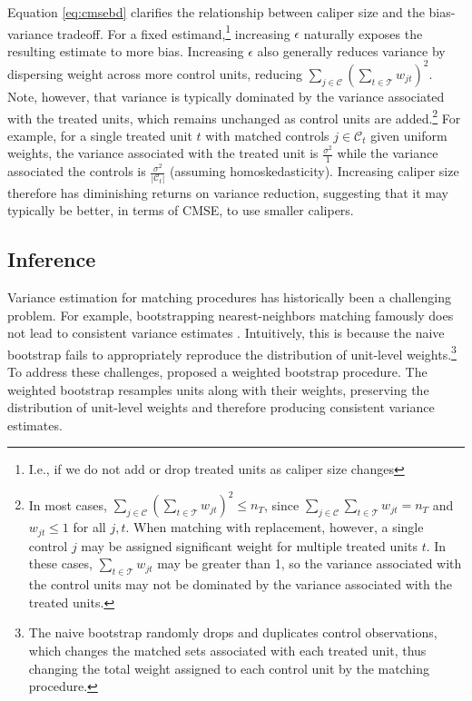 \documentclass{article}
\newcommand{\Ct}{\mathcal{C}_{t}}
\begin{document}
Equation \ref{eq:cmsebd} clarifies the relationship between caliper size and the bias-variance tradeoff.
For a fixed estimand,\footnote{I.e., if we do not add or drop treated units as caliper size changes} increasing $\epsilon$ naturally exposes the resulting estimate to more bias.
Increasing $\epsilon$ also generally reduces variance by dispersing weight across more control units, reducing $\sum_{j \in \mathcal{C}} (\sum_{t \in \mathcal{T}} w_{jt})^2$.
Note, however, that variance is typically dominated by the variance associated with the treated units, which remains unchanged as control units are added.\footnote{In most cases, $\sum_{j \in \mathcal{C}} (\sum_{t \in \mathcal{T}} w_{jt})^2 \leq n_T$, since $\sum_{j \in \mathcal{C}} \sum_{t \in \mathcal{T}} w_{jt} = n_T$ and $w_{jt} \leq 1$ for all $j, t$.
When matching with replacement, however, a single control $j$ may be assigned significant weight for multiple treated units $t$.
In these cases, $\sum_{t \in \mathcal{T}} w_{jt}$ may be greater than 1, so the variance associated with the control units may not be dominated by the variance associated with the treated units.}
For example, for a single treated unit $t$ with matched controls $j \in \Ct$ given uniform weights, the variance associated with the treated unit is
$\frac{\sigma^2}{1}$ while the variance associated the controls is $\frac{\sigma^2}{|\Ct|}$ (assuming homoskedasticity).
Increasing caliper size therefore has diminishing returns on variance reduction, suggesting that it may typically be better, in terms of CMSE, to use smaller calipers.


\subsection{Inference}


Variance estimation for matching procedures has historically been a challenging problem.
For example, bootstrapping nearest-neighbors matching famously does not lead to consistent variance estimates \citep{abadie2008failure}.
Intuitively, this is because the naive bootstrap fails to appropriately reproduce the distribution of unit-level weights.\footnote{The naive bootstrap randomly drops and duplicates control observations, which changes the matched sets associated with each treated unit, thus changing the total weight assigned to each control unit by the matching procedure.}
To address these challenges, \citet{otsu2017bootstrap} proposed a weighted bootstrap procedure.
The weighted bootstrap resamples units along with their weights, preserving the distribution of unit-level weights and therefore producing consistent variance estimates.
\end{document}
